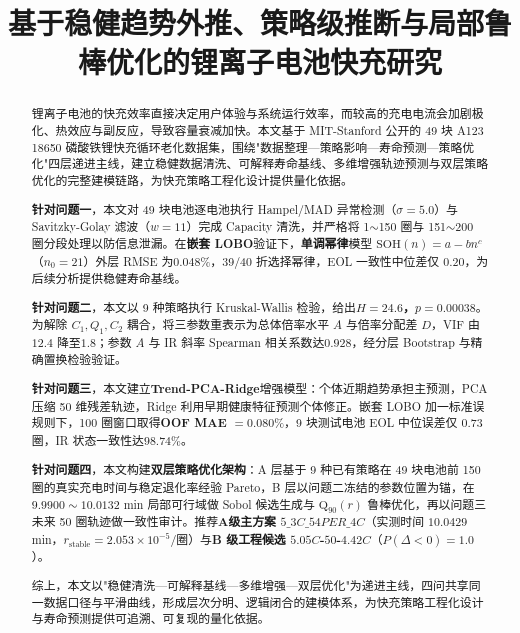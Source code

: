 \documentclass[withoutpreface]{cumcmthesis}
\title{基于稳健趋势外推、策略级推断与局部鲁棒优化的锂离子电池快充研究}
\newcommand{\paperstrong}[1]{\textbf{#1}}
\begin{document}
\maketitle

\begin{abstract}
\indent 锂离子电池的快充效率直接决定用户体验与系统运行效率，而较高的充电电流会加剧极化、热效应与副反应，导致容量衰减加快。本文基于 MIT-Stanford 公开的 49 块 A123 18650 磷酸铁锂快充循环老化数据集，围绕"数据整理—策略影响—寿命预测—策略优化"四层递进主线，建立稳健数据清洗、可解释寿命基线、多维增强轨迹预测与双层策略优化的完整建模链路，为快充策略工程化设计提供量化依据。

\indent \paperstrong{针对问题一}，本文对 49 块电池逐电池执行 Hampel/MAD 异常检测（$\sigma=5.0$）与 Savitzky-Golay 滤波（$w=11$）完成 Capacity 清洗，并严格将 1$\sim$150 圈与 151$\sim$200 圈分段处理以防信息泄漏。在\paperstrong{嵌套 LOBO}验证下，\paperstrong{单调幂律}模型 $\mathrm{SOH}(n)=a-bn^c$（$n_0=21$）外层 RMSE 为\paperstrong{$0.048\%$}，39/40 折选择幂律，EOL 一致性中位差仅 $0.20$，为后续分析提供稳健寿命基线。

\indent \paperstrong{针对问题二}，本文以 9 种策略执行 Kruskal-Wallis 检验，给出\paperstrong{$H=24.6$，$p=0.00038$}。为解除 $C_1,Q_1,C_2$ 耦合，将三参数重表示为总体倍率水平 $A$ 与倍率分配差 $D$，VIF 由 $12.4$ 降至\paperstrong{$1.8$}；参数 $A$ 与 IR 斜率 Spearman 相关系数达\paperstrong{$0.928$}，经分层 Bootstrap 与精确置换检验验证。

\indent \paperstrong{针对问题三}，本文建立\paperstrong{Trend-PCA-Ridge}增强模型：个体近期趋势承担主预测，PCA 压缩 50 维残差轨迹，Ridge 利用早期健康特征预测个体修正。嵌套 LOBO 加一标准误规则下，100 圈窗口取得\paperstrong{OOF MAE $=0.080\%$}，9 块测试电池 EOL 中位误差仅 $0.73$ 圈，IR 状态一致性达\paperstrong{$98.74\%$}。

\indent \paperstrong{针对问题四}，本文构建\paperstrong{双层策略优化架构}：A 层基于 9 种已有策略在 49 块电池前 150 圈的真实充电时间与稳定退化率经验 Pareto，B 层以问题二冻结的参数位置为锚，在 $9.9900\sim10.0132$ min 局部可行域做 Sobol 候选生成与 $\mathrm{Q}_{90}(r)$ 鲁棒优化，再以问题三未来 50 圈轨迹做一致性审计。推荐\paperstrong{A级主方案 $5\_3C\_54PER\_4C$}（实测时间 $10.0429$ min，$r_\text{stable}=2.053\times10^{-5}$/圈）与\paperstrong{B 级工程候选 $5.05C$-$50$-$4.42C$}（$P(\Delta<0)=1.0$）。

\indent 综上，本文以"稳健清洗—可解释基线—多维增强—双层优化"为递进主线，四问共享同一数据口径与平滑曲线，形成层次分明、逻辑闭合的建模体系，为快充策略工程化设计与寿命预测提供可追溯、可复现的量化依据。

\end{abstract}
\end{document}
